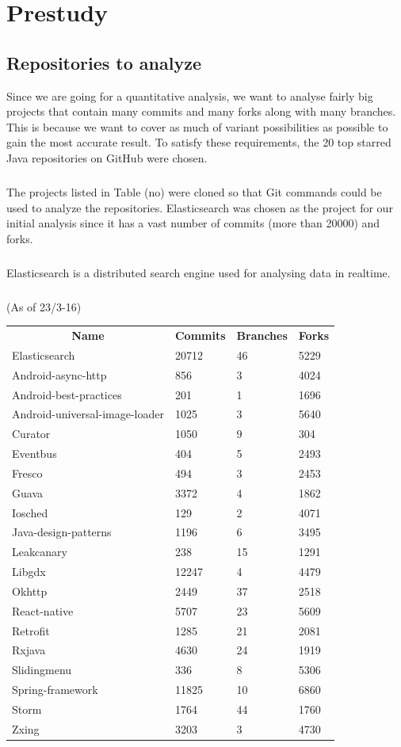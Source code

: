 \chapter{Prestudy}
\section{Repositories to analyze}
Since we are going for a quantitative analysis, we want to analyse fairly big projects that contain many commits and many forks along with many branches. This is because we want to cover as much of variant possibilities as possible to gain the most accurate result. To satisfy these requirements, the 20 top starred Java repositories on GitHub were chosen.
\paragraph*{}
The projects listed in Table (no) were cloned so that Git commands could be used to analyze the repositories. Elasticsearch was chosen as the project for our initial analysis since it has a vast number of commits (more than 20000) and forks.
\paragraph*{}
Elasticsearch is a distributed search engine used for analysing data in realtime. 
\paragraph*{}
(As of 23/3-16)\\
\begin{tabular}{ l l l l}
\hline
\multicolumn{1}{c}{\textbf{Name}} & \multicolumn{1}{c}{\textbf{Commits}} & \multicolumn{1}{c}{\textbf{Branches}} & \multicolumn{1}{c}{\textbf{Forks}}\\
Elasticsearch & 20712 & 46 & 5229\\
Android-async-http & 856 & 3 & 4024\\
Android-best-practices & 201 & 1 & 1696\\
Android-universal-image-loader & 1025 & 3 & 5640\\
Curator & 1050 & 9 & 304\\
Eventbus & 404 & 5 & 2493\\
Fresco & 494 & 3 & 2453\\
Guava & 3372 & 4 & 1862\\
Iosched & 129 & 2 & 4071\\
Java-design-patterns & 1196 & 6 & 3495\\
Leakcanary & 238 & 15 & 1291\\
Libgdx & 12247 & 4 & 4479\\
Okhttp & 2449 & 37 & 2518\\
React-native & 5707 & 23 & 5609\\
Retrofit & 1285 & 21 & 2081\\
Rxjava & 4630 & 24 & 1919\\
Slidingmenu & 336 & 8 & 5306\\
Spring-framework & 11825 & 10 & 6860\\
Storm & 1764 & 44 & 1760\\
Zxing & 3203 & 3 & 4730
\end{tabular}
